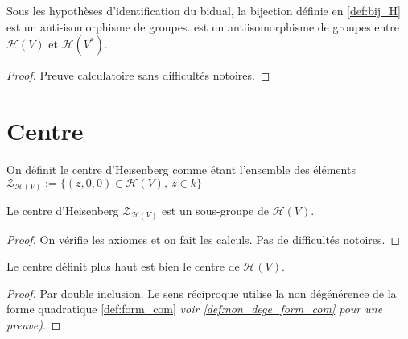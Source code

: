 \begin{definition}
    \label{prop:antiisoH}
    \leanok 

    Sous les hypothèses d'identification du bidual, la bijection définie en \ref{def:bij_H} est un anti-isomorphisme de groupes.
    est un antiisomorphisme de groupes entre $\mathcal{H}(V)$ et $\mathcal{H}(V^*)$.
    \begin{proof}
        \leanok
        Preuve calculatoire sans difficultés notoires.
    \end{proof}
\end{definition}

\section{Centre}

\begin{definition}
    \label{def:center_H}
    \leanok 

    On définit le centre d'Heisenberg comme étant l'ensemble des éléments
    $\mathcal{Z}_{\mathcal{H}(V)}:=\{(z,0,0)\in\mathcal{H}(V),\ z\in k\}$
\end{definition}

\begin{proposition}
    \label{prop:center_H_subgroup}
    \leanok

    Le centre d'Heisenberg $\mathcal{Z}_{\mathcal{H}(V)}$ est un sous-groupe
    de $\mathcal{H}(V)$.
    \begin{proof}
        \leanok
        On vérifie les axiomes et on fait les calculs. Pas de difficultés notoires.
    \end{proof}
\end{proposition}

\begin{proposition}
    \label{prop:center_H_is_center}
    \leanok

    Le centre définit plus haut est bien le centre de $\mathcal{H}(V)$.
    \begin{proof}
        \leanok
        Par double inclusion. Le sens réciproque utilise la non dégénérence de la forme
        quadratique \ref{def:form_com} \textit{voir \ref{def:non_dege_form_com} pour une preuve)}.
    \end{proof}
\end{proposition}

